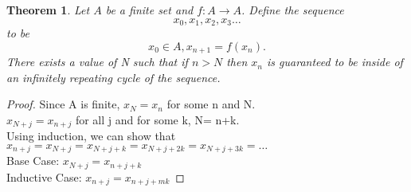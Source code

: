 \documentclass{article}
\newtheorem{theorem}{Theorem}
\begin{document}
\begin{theorem}
  Let $A$ be a finite set and $f : A \rightarrow A$. Define the sequence 
  \begin{equation}
    x_0, x_1, x_2, x_3 \ldots
  \end{equation}
  to be
  \begin{equation}
    x_0 \in A, x_{n+1} = f(x_n).
  \end{equation}
  There exists a value of N such that if $n > N$ then $x_n$ is guaranteed to be inside of an infinitely repeating cycle of the sequence.
\end{theorem}
\begin{proof}
Since A is finite, $x_{N} = x_n$ for some n and N.\\
$x_{N+j} = x_{n+j}$ for all j and for some k, N= n+k.\\
Using induction, we can show that $x_{n+j} = x_{N+j} = x_{N+j+k} = x_{N+j+2k} = x_{N+j+3k} = \ldots$\\
Base Case: $x_{N+j} = x_{n+j+k}$\\
Inductive Case: $x_{n+j} = x_{n+j+mk}$
\end{proof}
\end{document}
